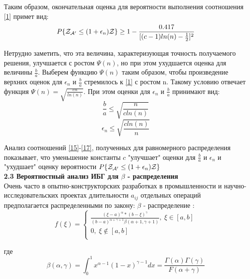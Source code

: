 \documentclass[a4paper, 14pt]{extarticle}
\begin{document}
Таким образом, окончательная оценка для вероятности выполнения соотношения \eqref{1} примет вид:
\begin{equation}\label{15}
P \{ \text{$\mathcal{Z_{A'}}$} \leq (1+\epsilon_n)\mathcal{Z} \} \geq 1 - \frac{0.417}{[(c-1)ln(n)-\frac{1}{2}]^2}
\end{equation}

Нетрудно заметить, что эта величина, характеризующая точность получаемого решения, улучшается с ростом $\Psi(n)$, но при этом ухудшается оценка для величины $\frac{b}{a}$. Выберем функцию $\Psi(n)$ таким образом, чтобы произведение верхних оценок для $\epsilon_n$ и $\frac{b}{a}$ стремилось к \eqref{1} с ростом n. Такому условию отвечает функция $\Psi(n) = \sqrt{\frac{cn}{ln(n)}}$. При этом оценки для $\epsilon_n$ и $\frac{b}{a}$ принимают вид:
\begin{equation}\label{16}
\frac{b}{a} \leq \sqrt{\frac{n}{cln(n)}}
\end{equation}
\begin{equation}\label{17}
\epsilon_n \leq \sqrt{\frac{cln(n)}{n}}
\end{equation}

Анализ соотношений \ref{15}-\ref{17}, полученных для равномерного распределения показывает, что уменьшение константы $c$ "улучшает" оценки для $\frac{b}{a}$ и $\epsilon_n$ и "ухудшает" оценку вероятности $P \{ \text{$\mathcal{Z_{A'}}$} \leq (1+\epsilon_n)\mathcal{Z} \}$\\

\textbf{2.3 Вероятностный анализ ИБГ для $\beta$ - распределения}\\

 Очень часто в опытно-конструкторских разработках в промышленности и научно-исследовательских проектах длительности $a_{ij}$ отдельных операций предполагается распределенными по закону: $\beta$ - распределение :
\begin{equation}
f(\xi) = 
\begin{cases}
   \frac{(\xi-a)^\alpha*(b-\xi)^\gamma}{(b-a)^{\alpha+\gamma+1} \beta(\alpha+1, \gamma+1)},  \; \xi \in [a,b]\\
   0, \; \xi \notin [a,b] \\
 \end{cases}
\end{equation}

где
\begin{equation}
\beta(\alpha, \gamma) = \int_0^1 x^{\alpha-1} (1-x)^{\gamma-1} dx = \frac{\Gamma(\alpha)\Gamma(\gamma)}{F(\alpha+\gamma)}
\end{equation}
\end{document}

